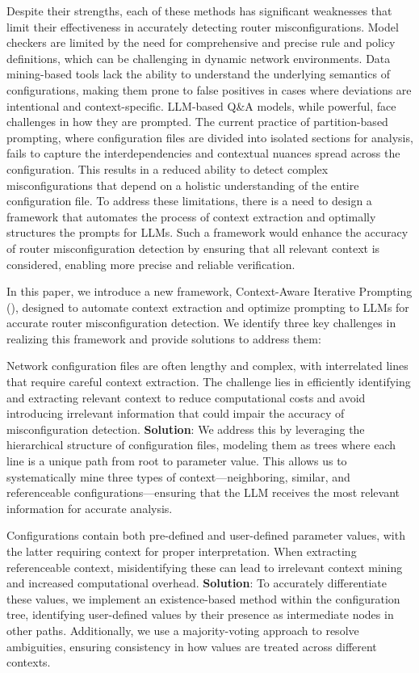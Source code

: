 Despite their strengths, each of these methods has significant weaknesses that limit their effectiveness in accurately detecting router misconfigurations. Model checkers are limited by the need for comprehensive and precise rule and policy definitions, which can be challenging in dynamic network environments. Data mining-based tools lack the ability to understand the underlying semantics of configurations, making them prone to false positives in cases where deviations are intentional and context-specific. LLM-based Q\&A models, while powerful, face challenges in how they are prompted. The current practice of partition-based prompting, where configuration files are divided into isolated sections for analysis, fails to capture the interdependencies and contextual nuances spread across the configuration. This results in a reduced ability to detect complex misconfigurations that depend on a holistic understanding of the entire configuration file. To address these limitations, there is a need to design a framework that automates the process of context extraction and optimally structures the prompts for LLMs. Such a framework would enhance the accuracy of router misconfiguration detection by ensuring that all relevant context is considered, enabling more precise and reliable verification.

In this paper, we introduce a new framework, Context-Aware Iterative Prompting (\sysname{}), designed to automate context extraction and optimize prompting to LLMs for accurate router misconfiguration detection. We identify three key challenges in realizing this framework and provide solutions to address them:

Network configuration files are often lengthy and complex, with interrelated lines that require careful context extraction. The challenge lies in efficiently identifying and extracting relevant context to reduce computational costs and avoid introducing irrelevant information that could impair the accuracy of misconfiguration detection. \textbf{Solution}: We address this by leveraging the hierarchical structure of configuration files, modeling them as trees where each line is a unique path from root to parameter value. This allows us to systematically mine three types of context—neighboring, similar, and referenceable configurations—ensuring that the LLM receives the most relevant information for accurate analysis.

Configurations contain both pre-defined and user-defined parameter values, with the latter requiring context for proper interpretation. When extracting referenceable context, misidentifying these can lead to irrelevant context mining and increased computational overhead. \textbf{Solution}: To accurately differentiate these values, we implement an existence-based method within the configuration tree, identifying user-defined values by their presence as intermediate nodes in other paths. Additionally, we use a majority-voting approach to resolve ambiguities, ensuring consistency in how values are treated across different contexts.

